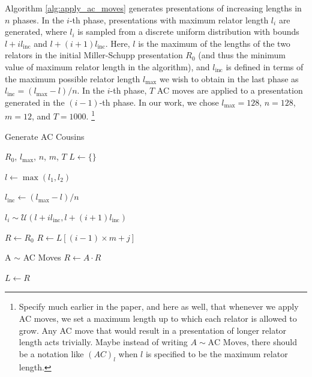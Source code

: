 Algorithm \autoref{alg:apply_ac_moves} generates presentations of increasing lengths in $n$ phases.
In the $i$-th phase, presentations with maximum relator length $l_i$ are generated, where $l_i$ is sampled from a discrete uniform distribution with bounds $l + i l_{\text{inc}} $ and $l + (i+1) l_{\text{inc}}$.
Here, $l$ is the maximum of the lengths of the two relators in the initial Miller-Schupp presentation $R_0$ (and thus the minimum value of maximum relator length in the algorithm), and $l_{\text{inc}}$ is defined in terms of the maximum possible relator length $l_{\text{max}}$ we wish to obtain in the last phase as $l_{\text{inc}} = (l_{\text{max}}-l)/n$.
In the $i$-th phase, $T$ AC moves are applied to a presentation generated in the $(i-1)$-th phase.
In our work, we chose $l_{\text{max}}=128$, $n=128$, $m=12$, and $T=1000$.
\footnote{Specify much earlier in the paper, and here as well, that whenever we apply AC moves, we set a maximum length up to which each relator is allowed to grow.
Any AC move that would result in a presentation of longer relator length acts trivially.
Maybe instead of writing $A \sim \text{AC Moves}$, there should be a notation like $(AC)_l$ when $l$ is specified to be the maximum relator length.}

\begin{algorithm}
	\caption{Generate AC Cousins}\label{alg:apply_ac_moves}
	\begin{algorithmic}
		\Require $R_0$, $l_{\text{max}}$, $n$, $m$, $T$
		\State $L \gets \{ \}$ 

		\State $l \gets \max(l_1, l_2)$


		\State $l_{\text{inc}} \gets (l_{\text{max}}-l)/n$




		\State $l_i \sim \mathcal{U}(l + i l_{\text{inc}} , l + (i+1) l_{\text{inc}})$

		\State $R \gets R_0$
		\Else
		\State $R \gets L[(i-1) \times m+j]$
		\EndIf




		\State A $\sim$ AC Moves
		\State $R \gets A \cdot R$

		\EndFor

		\State $L \gets R$


		\EndFor
		\EndFor
	\end{algorithmic}
\end{algorithm}


